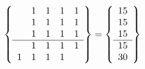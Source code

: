 \documentclass[twoside]{article}
\begin{document}
\begin{displaymath}
\left\{
\begin{array}{ccccc}
    & 1 & 1 & 1 & 1 \\
    & 1 & 1 & 1 & 1 \\
    & 1 & 1 & 1 & 1 \\
\hline
    & 1 & 1 & 1 & 1 \\
  1 & 1 & 1 & 1 &   \\
\end{array}
\right\}
=
\left\{
\begin{array}{r}
15 \\
15 \\
15 \\
\hline
15 \\
30 \\
\end{array}
\right\}
\end{displaymath}
\end{document}
